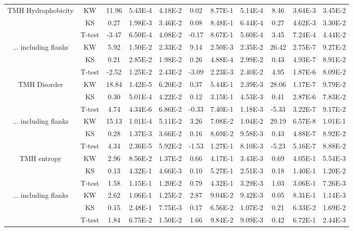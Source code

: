 \begin{table}[htbp]
\begin{tabular}{ccccccccccc}
		\midrule
		\multirow{3}[0]{*}{TMH Hydrophobicity} &  KW & 11.96 & 5.43E-4 & 4.18E-2 & 0.02  & 8.77E-1 & 5.14E-4 & 8.46  & 3.64E-3 & 3.45E-2 \\
								&  KS & 0.27  & 1.98E-3 & 3.46E-2 & 0.08  & 8.48E-1 & 6.44E-4 & 0.27  & 4.62E-3 & 3.30E-2 \\
								&  T-test & -3.47 & 6.50E-4 & 4.08E-2 & -0.17 & 8.67E-1 & 5.60E-4 & 3.45  & 7.24E-4 & 4.44E-2 \\
		\midrule
		\multirow{3}[0]{*}{... including flanks} &  KW & 5.92  & 1.50E-2 & 2.33E-2 & 9.14  & 2.50E-3 & 2.35E-2 & 26.42 & 2.75E-7 & 9.27E-2 \\
								&  KS & 0.21  & 2.85E-2 & 1.98E-2 & 0.26  & 4.88E-4 & 2.99E-2 & 0.43  & 4.93E-7 & 8.91E-2 \\
								&  T-test & -2.52 & 1.25E-2 & 2.43E-2 & -3.09 & 2.23E-3 & 2.40E-2 & 4.95  & 1.87E-6 & 8.09E-2 \\
	  \midrule
		\multirow{3}[0]{*}{TMH Disorder} &  KW & 18.84 & 1.42E-5 & 6.20E-2 & 0.37  & 5.44E-1 & 2.39E-3 & 28.06 & 1.17E-7 & 9.79E-2 \\
								&  KS & 0.30  & 5.01E-4 & 4.22E-2 & 0.12  & 3.15E-1 & 4.53E-3 & 0.41 & 2.87E-6 & 7.83E-2 \\
								&  T-test & 4.74  & 4.34E-6 & 6.86E-2 & -0.33 & 7.40E-1 & 1.18E-3 & -5.33 & 3.22E-7 & 9.17E-2 \\
		\midrule
		\multirow{3}[0]{*}{... including flanks} &  KW & 15.13 & 1.01E-4 & 5.11E-2 & 3.26  & 7.08E-2 & 1.04E-2 & 29.19 & 6.57E-8 & 1.01E-1 \\
								&  KS & 0.28  & 1.37E-3 & 3.66E-2 & 0.16  & 8.69E-2 & 9.58E-3 & 0.43 & 4.88E-7 & 8.92E-2 \\
								&  T-test & 4.34  & 2.36E-5 & 5.92E-2 & -1.53 & 1.27E-1 & 8.10E-3 & -5.23 & 5.16E-7 & 8.88E-2 \\
		\midrule
		\multirow{3}[0]{*}{TMH entropy} &  KW & 2.96  & 8.56E-2 & 1.37E-2 & 0.66  & 4.17E-1 & 3.43E-3 & 0.69  & 4.05E-1 & 5.54E-3 \\
								&  KS & 0.13  & 4.32E-1 & 4.66E-3 & 0.10  & 5.27E-1 & 2.51E-3 & 0.18 & 1.40E-1 & 1.20E-2 \\
								&  T-test & 1.58  & 1.15E-1 & 1.20E-2 & 0.79  & 4.32E-1 & 3.29E-3 & 1.03 & 3.06E-1 & 7.26E-3 \\
		\midrule
		\multirow{3}[0]{*}{... including flanks} &  KW & 2.62  & 1.06E-1 & 1.25E-2 & 2.87  & 9.04E-2 & 9.42E-3 & 0.05 & 8.31E-1 & 1.14E-3 \\
								&  KS & 0.15  & 2.48E-1 & 7.75E-3 & 0.17  & 6.56E-2 & 1.07E-2 & 0.21 & 6.33E-2 & 1.69E-2 \\
								&  T-test & 1.84  & 6.75E-2 & 1.50E-2 & 1.66  & 9.84E-2 & 9.09E-3 & 0.42 & 6.72E-1 & 2.44E-3 \\
		\end{tabular}%
						\label{table:organellesswissstats}
		\end{table}%

